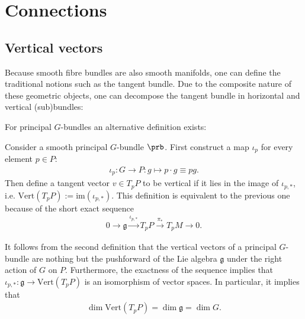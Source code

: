 \section{Connections}\label{section:connections}
\subsection{Vertical vectors}

    Because smooth fibre bundles are also smooth manifolds, one can define the traditional notions such as the tangent bundle. Due to the composite nature of these geometric objects, one can decompose the tangent bundle in horizontal and vertical (sub)bundles:

    For principal $G$-bundles an alternative definition exists:
    \begin{adefinition}
        Consider a smooth principal $G$-bundle $\prb$. First construct a map $\iota_p$ for every element $p\in P$:
        \begin{gather}
            \iota_p:G\rightarrow P: g\mapsto p\cdot g\equiv pg.
        \end{gather}
        Then define a tangent vector $v\in T_p P$ to be vertical if it lies in the image of $\iota_{p,\ast}$, i.e. $\text{Vert}(T_pP) := \text{im}(\iota_{p,\ast})$. This definition is equivalent to the previous one because of the short exact sequence
        \begin{gather}
            0\longrightarrow\mathfrak{g}\overset{\iota_{p,\ast}}{\longrightarrow}T_pP\overset{\pi_\ast}{\longrightarrow}T_pM\longrightarrow0.
        \end{gather}
    \end{adefinition}

    \begin{property}\label{diff:vertical_dimension}
        It follows from the second definition that the vertical vectors of a principal $G$-bundle are nothing but the pushforward of the Lie algebra $\mathfrak{g}$ under the right action of $G$ on $P$. Furthermore, the exactness of the sequence implies that $\iota_{p,\ast}:\mathfrak{g}\rightarrow\text{Vert}(T_pP)$ is an isomorphism of vector spaces. In particular, it implies that
        \begin{gather}
            \dim\text{Vert}(T_pP) = \dim\mathfrak{g} = \dim G.
        \end{gather}
    \end{property}

